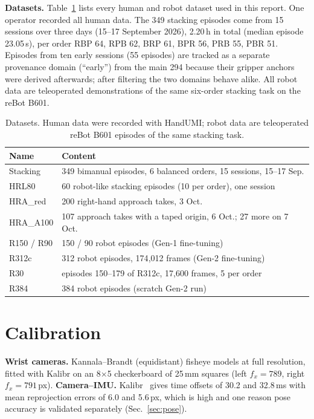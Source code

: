 \documentclass[conference,10pt]{IEEEtran}
\newcommand{\mm}{\,mm\xspace}
\begin{document}
\textbf{Datasets.} Table~\ref{tab:data} lists every human and robot dataset used in this report. One operator recorded all human
data. The 349 stacking episodes come from 15 sessions over three days (15--17 September 2026), 2.20\,h in total (median episode
23.05\,s), per order RBP 64, RPB 62, BRP 61, BPR 56, PRB 55, PBR 51. Episodes from ten early sessions (55 episodes) are tracked as a
separate provenance domain (``early'') from the main 294 because their gripper anchors were derived afterwards; after
filtering the two domains behave alike. All robot data are teleoperated demonstrations of the same six-order stacking task on
the reBot B601.

\begin{table}[t]
\centering\footnotesize\setlength{\tabcolsep}{3pt}
\caption{Datasets. Human data were recorded with HandUMI; robot data are teleoperated reBot B601 episodes of the same stacking task.}
\label{tab:data}
\begin{tabular}{@{}lp{56mm}@{}}
\toprule
Name & Content \\
\midrule
Stacking & 349 bimanual episodes, 6 balanced orders, 15 sessions, 15--17 Sep. \\
HRL80 & 60 robot-like stacking episodes (10 per order), one session \\
HRA\_red & 200 right-hand approach takes, 3 Oct. \\
HRA\_A100 & 107 approach takes with a taped origin, 6 Oct.; 27 more on 7 Oct. \\
\midrule
R150 / R90 & 150 / 90 robot episodes (Gen-1 fine-tuning) \\
R312c & 312 robot episodes, 174{,}012 frames (Gen-2 fine-tuning) \\
R30 & episodes 150--179 of R312c, 17{,}600 frames, 5 per order \\
R384 & 384 robot episodes (scratch Gen-2 run) \\
\bottomrule
\end{tabular}
\end{table}

\section{Calibration}\label{sec:cal}
\textbf{Wrist cameras.} Kannala--Brandt (equidistant) fisheye models at full resolution, fitted with Kalibr on an 8$\times$5
checkerboard of 25\mm squares (left $f_x{=}789$, right $f_x{=}791$\,px). \textbf{Camera--IMU.} Kalibr~\cite{furgale2013kalibr}
gives time offsets of 30.2 and 32.8\,ms with mean reprojection errors of 6.0 and 5.6\,px, which is high and one reason pose
accuracy is validated separately (Sec.~\ref{sec:pose}).
\end{document}
